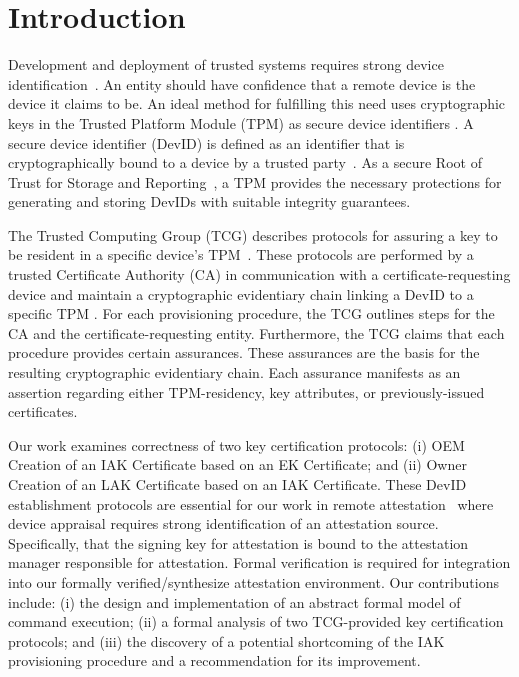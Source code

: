 \documentclass[runningheads]{llncs}
\begin{document}
\section{Introduction}
Development and deployment of trusted systems requires strong device
identification~\citep{Martin:08:The-ten-page-in}. An entity should
have confidence that a remote device is the device it claims to be. An
ideal method for fulfilling this need uses cryptographic keys in the
Trusted Platform Module (TPM) as secure device identifiers
\citep{DevIDSpec-TCG}. A secure device identifier (DevID) is defined
as an identifier that is cryptographically bound to a device by a
trusted party~\citep{DevIDSpec-IEEE}.  As a secure Root of Trust for
Storage and Reporting~\citep{TPMSpec}, a TPM provides the necessary
protections for generating and storing DevIDs with suitable integrity
guarantees.

The Trusted Computing Group (TCG) describes protocols for assuring a
key to be resident in a specific device's
TPM~\citep{DevIDSpec-TCG}. These protocols are performed by a trusted
Certificate Authority (CA) in communication with a
certificate-requesting device and maintain a cryptographic evidentiary
chain linking a DevID to a specific TPM \citep{DevIDSpec-TCG}.  For
each provisioning procedure, the TCG outlines steps for the CA and the
certificate-requesting entity. Furthermore, the TCG claims
that each procedure provides certain assurances. These assurances are
the basis for the resulting cryptographic evidentiary chain.  Each
assurance manifests as an assertion regarding either TPM-residency,
key attributes, or previously-issued certificates.

Our work examines correctness of two key certification protocols: (i)
OEM Creation of an IAK Certificate based on an EK Certificate; and
(ii) Owner Creation of an LAK Certificate based on an IAK
Certificate. These DevID establishment protocols are essential for our
work in remote
attestation~\cite{Coker::Principles-of-R,petz2022innovations} where
device appraisal requires strong identification of an attestation
source. Specifically, that the signing key for attestation is bound to
the attestation manager responsible for attestation.  Formal
verification is required for integration into our formally
verified/synthesize attestation
environment\citep{petz2022innovations}.  Our contributions include:
(i) the design and implementation of an abstract formal model of
command execution; (ii) a formal analysis of two TCG-provided key
certification protocols; and (iii) the discovery of a potential
shortcoming of the IAK provisioning procedure and a recommendation for
its improvement.
\end{document}
